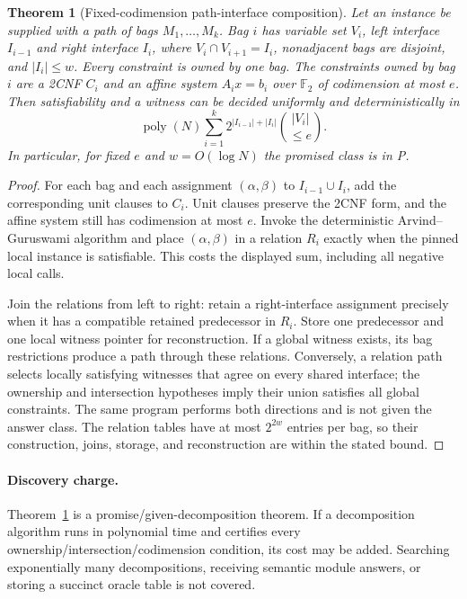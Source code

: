\documentclass[10pt]{article}
\newtheorem{theorem}{Theorem}
\newcommand{\F}{\mathbb F_2}
\begin{document}
\begin{theorem}[Fixed-codimension path-interface composition]\label{thm:path}
Let an instance be supplied with a path of bags $M_1,\dots,M_k$.  Bag $i$ has variable set
$V_i$, left interface $I_{i-1}$ and right interface $I_i$, where
$V_i\cap V_{i+1}=I_i$, nonadjacent bags are disjoint, and $|I_i|\le w$.  Every constraint is
owned by one bag.  The constraints owned by bag $i$ are a 2CNF $C_i$ and an affine system
$A_i x=b_i$ over $\F$ of codimension at most $e$.  Then satisfiability and a witness can be
decided uniformly and deterministically in
\[
  \operatorname{poly}(N)\sum_{i=1}^k
  2^{|I_{i-1}|+|I_i|}\binom{|V_i|}{\le e}.
\]
In particular, for fixed $e$ and $w=O(\log N)$ the promised class is in P.
\end{theorem}

\begin{proof}
For each bag and each assignment $(\alpha,\beta)$ to
$I_{i-1}\cup I_i$, add the corresponding unit clauses to $C_i$.  Unit clauses preserve the
2CNF form, and the affine system still has codimension at most $e$.  Invoke the deterministic
Arvind--Guruswami algorithm and place $(\alpha,\beta)$ in a relation $R_i$ exactly when the
pinned local instance is satisfiable.  This costs the displayed sum, including all negative
local calls.

Join the relations from left to right: retain a right-interface assignment precisely when it
has a compatible retained predecessor in $R_i$.  Store one predecessor and one local witness
pointer for reconstruction.  If a global witness exists, its bag restrictions produce a path
through these relations.  Conversely, a relation path selects locally satisfying witnesses
that agree on every shared interface; the ownership and intersection hypotheses imply their
union satisfies all global constraints.  The same program performs both directions and is not
given the answer class.  The relation tables have at most $2^{2w}$ entries per bag, so their
construction, joins, storage, and reconstruction are within the stated bound.
\end{proof}

\paragraph{Discovery charge.}
Theorem~\ref{thm:path} is a promise/given-decomposition theorem.  If a decomposition algorithm
runs in polynomial time and certifies every ownership/intersection/codimension condition, its
cost may be added.  Searching exponentially many decompositions, receiving semantic module
answers, or storing a succinct oracle table is not covered.
\end{document}
